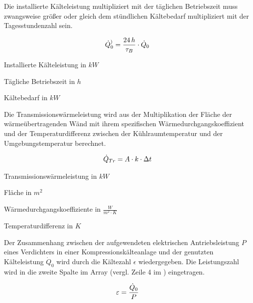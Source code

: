 Die installierte Kälteleistung multipliziert mit der täglichen Betriebszeit muss
zwangsweise größer oder gleich dem stündlichen Kältebedarf multipliziert mit der
Tagesstundenzahl sein.

\begin{equation}
	\pinstall = \frac{24\,h}{ \tau_{B} }  \cdot \pkalt \label{pinstall}
\end{equation}

\begin{description}[\dth]

	\item[$\pinstall$] Installierte Kälteleistung in $kW$
	\item[$\tau_{B}$] Tägliche Betriebszeit in $h$
	\item[$\pkalt$] Kältebedarf in $kW$

\end{description}
\vspace{0.5cm}

Die Transmissionswärmeleistung wird aus der Multiplikation der Fläche
der wärmeübertragenden Wänd mit ihrem spezifischen Wärmedurchgangskoeffizient
und der Temperaturdifferenz zwischen der Kühlraumtemperatur und der
Umgebungstemperatur berechnet.

\begin{equation}
	\ptrans = A \cdot k \cdot \Delta t
	\label{ptrans}
\end{equation}

\begin{description}[\dth]

	\item[$\ptrans$] Transmissionswärmeleistung in $kW$
	\item[$A$] Fläche in $m^2$
	\item[$k$] Wärmedurchgangskoeffiziente in $\frac{W}{m^2 \cdot K}$
	\item[$\Delta\: t$] Temperaturdifferenz in $K$

\end{description}
\vspace{0.5cm}

Der Zusammenhang zwischen der aufgewendeten elektrischen Antriebsleistung $P$
eines Verdichters in einer Kompressionskälteanlage und der genutzten
Kälteleistung ${\dot{Q}}_0$ wird durch die Kältezahl $\epsilon$ wiedergegeben.
Die Leistungszahl wird in die zweite Spalte im Array (vergl. Zeile 4 im
) eingetragen.

\begin{equation}
	\epsilon = \frac{\pkalt}{P}
\label{epsilon}
\end{equation}

